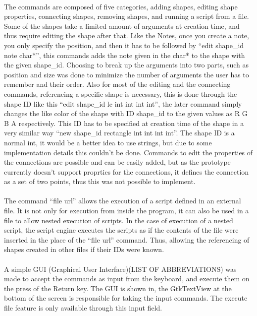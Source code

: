 \paragraph{} 
The commands are composed of five categories, adding shapes, editing shape properties, connecting shapes, removing shapes, and running a script from a file.
Some of the shapes take a limited amount of arguments at creation time, and thus require editing the shape after that. Like the Notes, once you create a note, you only specify the position, and then it has to be followed by ``edit shape\_id note char*'', this commands adds the note given in the char* to the shape with the given shape\_id. Choosing to break up the arguments into two parts, such as position and size was done to minimize the number of arguments the user has to remember and their order. Also for most of the editing and the connecting commands, referencing a specific shape is necessary, this is done through the shape ID like this ``edit shape\_id lc int int int int'', the later command simply changes the like color of the shape with ID shape\_id to the given values as R G B A respectively. This ID has to be specified at creation time of the shape in a very similar way ``new shape\_id rectangle int int int int''. The shape ID is a normal int, it would be a better idea to use strings, but due to some implementation details this couldn't be done. Commands to edit the properties of the connections are possible and can be easily added, but as the prototype currently doesn't support proprties for the connections, it defines the connection as a set of two points, thus this was not possible to implement.

\paragraph{}
The command ``file url'' allows the execution of a script defined in an external file. It is not only for execution from inside the program, it can also be used in a file to allow nested execution of scripts. In the case of execution of a nested script, the script engine executes the scripts as if the contents of the file were inserted in the place of the ``file url'' command. Thus, allowing the referencing of shapes created in other files if their IDs were known.

\paragraph{}
A simple GUI (Graphical User Interface)(LIST OF ABBREVIATIONS) was made to accept the commands as input from the keyboard, and execute them on the press of the Return key. The GUI is shown in, the GtkTextView at the bottom of the screen is responsible for taking the input commands. The execute file feature is only available through this input field.

